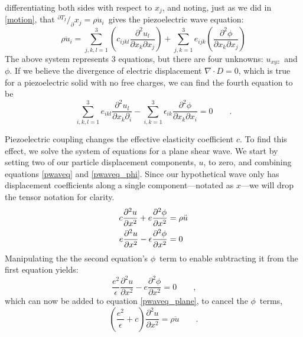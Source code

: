 \documentclass[a4paper,10pt]{report}
\numberwithin{equation}{section}
\begin{document}
{\begin{section}
\begin{equation}
\end{equation}
differentiating both sides with respect to $x_j$, and noting, just as we did in \eqref{motion}, that ${}^{\partial T_I} /_\partial x_j = \rho \ddot{u}_i$\  gives the piezoelectric wave equation\cite[p.~27]{Ballantine1997}:
\begin{equation}
\rho\ddot{u}_i = \sum_{j,k,l = 1}^3 \left( c_{ijkl} \frac{\partial^2 u_l}{\partial x_k \partial x_j} \right) 
+ \sum_{j,k=1}^3 e_{ijk}\left( \frac{\partial^2 \phi}{\partial x_k \partial x_j} \right)
\end{equation}
The above system represents 3 equations, but there are four unknowns: $u_{xyz}$\  and $\phi$. If we believe the divergence of electric displacement $\nabla \cdot D = 0$, which is true for a piezoelectric solid with no free charges, we can find the fourth equation to be\cite[p.~27]{Ballantine1997}
\begin{equation}
\sum_{i,k,l=1}^3 e_{ikl}\frac{\partial^2 u_l}{\partial x_k \partial_i} - \sum_{i,k=1}^3 \epsilon_{ik} \frac{\partial^2 \phi}{\partial x_k \partial x_i} = 0 \qquad \text{.}
\end{equation}
\par
Piezoelectric coupling changes the effective elasticity coefficient $c$. To find this effect, we solve the system of equations for a plane shear wave. We start by setting two of our particle displacement components, $u$, to zero, and combining equations \eqref{pwaveq} and \eqref{pwaveq_phi}. Since our hypothetical wave only has displacement coefficients along a single component---notated as $x$---we will drop the tensor notation for clarity. \cite[p.~27]{Ballantine1997}
\begin{align}
c \frac{\partial^2 u}{\partial x^2} + e \frac{\partial^2 \phi}{\partial x^2} &= \rho \ddot{u}
\\
e \frac{\partial^2 u}{\partial x^2} - \epsilon \frac{\partial^2 \phi}{\partial x^2} &= 0\notag
\end{align}
Manipulating the the second equation's $\phi$\  term to enable subtracting it from the first equation yields:
\begin{equation*}
\frac{e^2}{\epsilon} \frac{\partial^2 u}{\partial x^2} - e \frac{\partial^2 \phi}{\partial x^2} = 0 \qquad  \text{,}
\end{equation*}
which can now be added to equation \eqref{pwaveq_plane}, to cancel the $\phi$\  terms,
\begin{equation*}
\left(\frac{e^2}{\epsilon} + c\right) \frac{\partial^2u}{\partial x^2} = \rho \ddot{u} \qquad \text{.}

\end{equation*}
\end{section}}
\end{document}
